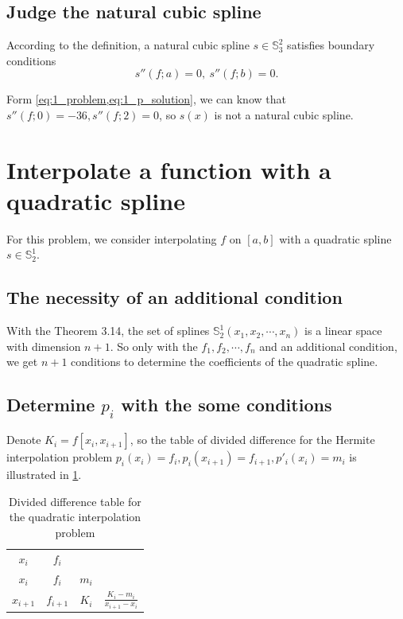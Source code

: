\documentclass[a4paper]{article}
\begin{document}
\subsection{Judge the natural cubic spline}

According to the definition, a natural cubic spline $s \in \mathbb{S}_3^2$ satisfies boundary conditions
\begin{equation}
  s''(f; a) = 0,\ s''(f; b) = 0.
  \label{eq:1_natural_cubic_spline}
\end{equation}

Form \cref{eq:1_problem,eq:1_p_solution}, we can know that $s''(f; 0) = -36, s''(f; 2) = 0$, so $s(x)$ is not a natural cubic spline.

\section{Interpolate a function with a quadratic spline}

For this problem, we consider interpolating $f$ on $[a, b]$ with a quadratic spline $s \in \mathbb{S}_2^1$.

\subsection{The necessity of an additional condition}

With the Theorem 3.14, the set of splines $\mathbb{S}_2^1(x_1, x_2, \cdots, x_n)$ is a linear space with dimension $n + 1$. 
So only with the $f_1, f_2, \cdots, f_n$ and an additional condition, we get $n + 1$ conditions to determine the coefficients of the quadratic spline.

\subsection{Determine $p_i$ with the some conditions}

Denote $K_i = f[x_i, x_{i + 1}]$, so the table of divided difference for the Hermite interpolation problem $p_i(x_i) = f_i, p_i(x_{i + 1}) = f_{i + 1}, p'_i(x_i) = m_i$ is illustrated in \cref{tb:2_divided_difference}.

\begin{table}[htbp]
  \centering
  \begin{tabular}{c|ccc}
    $x_i$ & $f_i$ & & \\
    $x_i$ & $f_i$ & $m_i$ & \\
    $x_{i + 1}$ & $f_{i + 1}$ & $K_i$ & $\frac{K_i - m_i}{x_{i + 1} - x_i}$ \\
  \end{tabular}
  \caption{Divided difference table for the quadratic interpolation problem}
  \label{tb:2_divided_difference}
\end{table}
\end{document}
